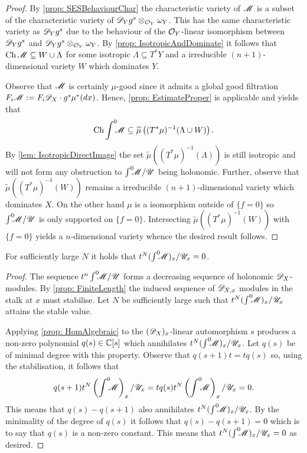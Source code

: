 \begin{proof}
  By \cref{prop: SESBehaviourChar} the characteristic variety of $\mathscr{M}$ is a subset of the characteristic variety of $\mathscr{D}_Yg^s \otimes_{\mathcal{O}_Y} \omega_Y$.
  This has the same characteristic variety as $\mathscr{D}_Y g^s$ due to the behaviour of the $\mathcal{O}_Y$-linear isomorphism between $\mathscr{D}_Yg^s$ and $\mathscr{D}_Yg^s \otimes_{\mathcal{O}_Y} \omega_Y$.
  By \cref{prop: IsotropicAndDominate} it follows that $\operatorname{Ch} \mathscr{M} \subseteq W \cup \Lambda$ for some isotropic $\Lambda\subseteq T^*Y$ and a irreducible $(n+1)$-dimensional variety $W$ which dominates $Y$.

  Observe that $\mathscr{M}$ is certainly $\mu$-good since it admits a global good filtration $F_i\mathscr{M} := F_i\mathscr{D}_X \cdot g^s \mu^*(dx)$.
  Hence, \cref{prop: EstimateProper} is applicable and yields that
  $$\operatorname{Ch} \int^0 \mkern -8mu \mathscr{M} \subseteq \widetilde{\mu}\left((T^*\mu)^{-1} (\Lambda \cup W)\right).$$
  By \cref{lem: IsotropicDirectImage} the set $\widetilde{\mu}((T^*\mu)^{-1}(\Lambda))$ is still isotropic and will not form any obstruction to $\int^0 \mkern -8mu\mathscr{M}/\mathscr{U}$ being holonomic.
  Further, observe that $\widetilde{\mu}((T^*\mu)^{-1}(W))$ remains a irreducible $(n+1)$-dimensional variety which dominates $X$.
  On the other hand $\mu$ is a isomorphism outside of $\{f = 0\}$ so $\int^0 \mkern -8mu\mathscr{M}/\mathscr{U}$ is only supported on $\{f = 0\}$.
  Intersecting $\widetilde{\mu}((T^*\mu)^{-1}(W))$ with $\{f = 0\}$ yields a $n$-dimensional variety whence the desired result follows.
\end{proof}
\begin{proposition}\label{prop: StableZero}
  For sufficiently large $N$ it holds that $t^N (\int^0 \mkern -8mu \mathscr{M})_x / \mathscr{U}_x = 0$.
\end{proposition}
\begin{proof}
  The sequence $t^n \int^0 \mkern -8mu\mathscr{M} / \mathscr{U}$ forms a decreasing sequence of holonomic $\mathscr{D}_X$-modules.
  By \cref{prop: FiniteLength} the induced sequence of $\mathscr{D}_{X,x}$ modules in the stalk at $x$ must stabilise.
  Let $N$ be sufficiently large such that $t^N(\int^0 \mkern -8mu\mathscr{M})_x/\mathscr{U}_x$ attains the stable value.

  Applying \cref{prop: HomAlgebraic} to the $(\mathscr{D}_X)_x$-linear automorphism $s$ produces a non-zero polynomial $q(s)\in \mathbb{C}[s]$ which annihilates $t^N(\int^0 \mkern -8mu\mathscr{M})_x/\mathscr{U}_x$.
  Let $q(s)$ be of minimal degree with this property.
  Observe that $q(s+1)t = tq(s)$ so, using the stabilisation, it follows that
  $$q(s+1)t^N\left(\int^0 \mkern -8mu\mathscr{M}\right)_x/\mathscr{U}_x = t q(s) t^N\left(\int^0 \mkern -8mu\mathscr{M}\right)_x/\mathscr{U}_x = 0.$$
  This means that $q(s) - q(s+1)$ also annihilates $t^N(\int^0 \mkern -8mu\mathscr{M})_x/\mathscr{U}_x$.
  By the minimality of the degree of $q(s)$ it follows that $q(s) - q(s+1)=0$ which is to say that $q(s)$ is a non-zero constant.
  This means that $t^N(\int^0 \mkern -8mu\mathscr{M})_x/\mathscr{U}_x = 0 $ as desired.
\end{proof}

